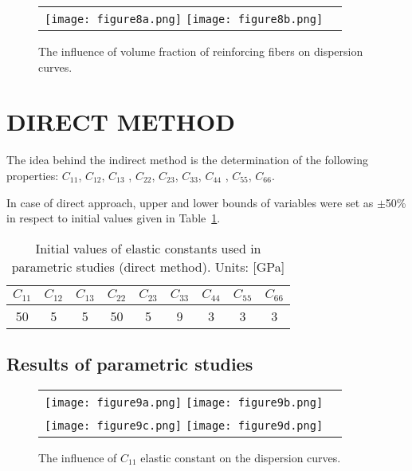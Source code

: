 \documentclass[]{spie}  %
\begin{document}
\begin{figure} [ht]
	\begin{center}
		\begin{tabular}{cc} %
			\texttt{[image: figure8a.png]}
			\texttt{[image: figure8b.png]}
		\end{tabular}
	\end{center}
	\caption[] 
	{ \label{fig:vol} 
		The influence of volume fraction of reinforcing fibers on dispersion curves.}
\end{figure} 

\clearpage
\section{DIRECT METHOD}
\label{sec:direct}
The idea behind the indirect method is the determination of the following properties:
\(C_{11}\), \(C_{12}\), \(C_{13}\) , \(C_{22}\), \(C_{23}\), \(C_{33}\), \(C_{44}\) , \(C_{55}\), 
\(C_{66}\).

In case of direct approach, upper and lower bounds of variables were set as  
\(\pm\)50\% in respect to initial values given in Table~\ref{tab:Ctensor_initial}.
\begin{table}[h!]
	\renewcommand{\arraystretch}{1.3}
	\caption{Initial values of elastic constants used in parametric studies (direct method). 
	Units: [GPa]}
		\label{tab:Ctensor_initial}
	\begin{center}
		\begin{tabular}{ccccccccc} 
			\toprule
			\(C_{11}\) & \(C_{12}\) & \(C_{13}\)  & \(C_{22}\) & \(C_{23}\) & \(C_{33}\) & 
			\(C_{44}\)  & \(C_{55}\) & \(C_{66}\) \\
			\midrule
			50 &5& 5&  50 & 5 & 9 & 3 & 3 & 3\\
			\bottomrule 
		\end{tabular} 
	\end{center}
\end{table}

\subsection{Results of parametric studies}


\begin{figure} [ht]
	\begin{center}
		\begin{tabular}{cc} %
			\texttt{[image: figure9a.png]}
			\texttt{[image: figure9b.png]}\\
			\texttt{[image: figure9c.png]}
			\texttt{[image: figure9d.png]}
		\end{tabular}
	\end{center}
	\caption[] 
	{ \label{fig:C11} 
		The influence of \(C_{11}\) elastic constant on the dispersion curves.}
\end{figure} 
\end{document}
